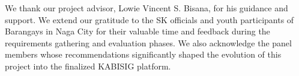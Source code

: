 \begin{acknowledgements}

\hspace*{\parindent}We thank our project advisor, Lowie Vincent S. Bisana, for his guidance and support. We extend our gratitude to the SK officials and youth participants of Barangays in Naga City for their valuable time and feedback during the requirements gathering and evaluation phases. We also acknowledge the panel members whose recommendations significantly shaped the evolution of this project into the finalized KABISIG platform. \vspace{5mm}


\end{acknowledgements}
